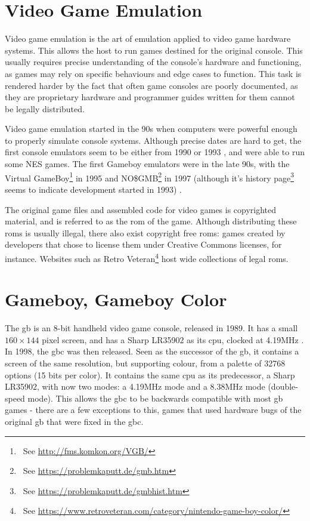 \documentclass[11pt]{report}
\newcommand{\ftnt}[1]{\footnote{~See \url{#1}}}
\begin{document}
\section{Video Game Emulation}

Video game emulation is the art of emulation applied to video game hardware systems. This allows the host to run games destined for the original console. This usually requires precise understanding of the console's hardware and functioning, as games may rely on specific behaviours and edge cases to function. This task is rendered harder by the fact that often game consoles are poorly documented, as they are proprietary hardware and programmer guides written for them cannot be legally distributed.

Video game emulation started in the 90s when computers were powerful enough to properly simulate console systems. Although precise dates are hard to get, the first console emulators seem to be either from 1990 or 1993 \cite{first_nes_emu}, and were able to run some NES games. The first Gameboy emulators were in the late 90s, with the Virtual GameBoy\ftnt{http://fms.komkon.org/VGB/} in 1995 and NO\$GMB\ftnt{https://problemkaputt.de/gmb.htm} in 1997 (although it's history page\ftnt{https://problemkaputt.de/gmbhist.htm} seems to indicate development started in 1993) \cite{first_gb_emus}.

The original game files and assembled code for video games is copyrighted material, and is referred to as the \gls{rom} of the game. Although distributing these \glspl{rom} is usually illegal, there also exist copyright free \glspl{rom}: games created by developers that chose to license them under Creative Commons licenses, for instance. Websites such as Retro Veteran\ftnt{https://www.retroveteran.com/category/nintendo-game-boy-color/} host wide collections of legal \glspl{rom}.

\section{Gameboy, Gameboy Color}

The \gls{gb} is an 8-bit handheld video game console, released in 1989. It has a small $160 \times 144$ pixel screen, and has a Sharp LR35902 as its \gls{cpu}, clocked at 4.19MHz \cite[Specifications]{pandoc}. In 1998, the \gls{gbc} was then released. Seen as the successor of the \gls{gb}, it contains a screen of the same resolution, but supporting colour, from a palette of 32768 options (15 bits per color). It contains the same \gls{cpu} as its predecessor, a Sharp LR35902, with now two modes: a 4.19MHz mode and a 8.38MHz mode (double-speed mode). This allows the \gls{gbc} to be backwards compatible with most \gls{gb} games - there are a few exceptions to this, games that used hardware bugs of the original \gls{gb} that were fixed in the \gls{gbc}.
\end{document}
